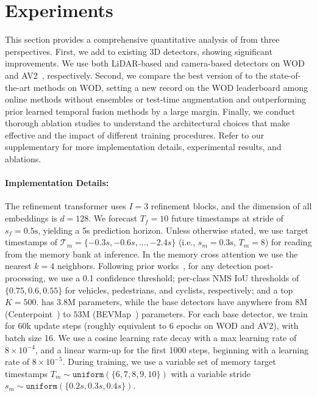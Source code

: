 

\section{Experiments}
\label{sec:experiments}

This section provides a comprehensive quantitative analysis of \ourmodel{}
from three perspectives. 
First, we add \ourmodel{} to existing 3D detectors, showing significant improvements. We use both LiDAR-based and camera-based detectors on WOD~\cite{WOD} and AV2~\cite{wilson2023argoverse}, respectively.
Second, we compare the best version of \ourmodel{} to the state-of-the-art methods on WOD, setting a new record on the WOD leaderboard among online methods without ensembles or test-time augmentation and outperforming prior learned temporal fusion methods by a large margin.
Finally, we conduct thorough ablation studies to understand the architectural choices that make \ourmodel{} effective and the impact of different training procedures.
Refer to our supplementary for more implementation details,
experimental results, and ablations.

\paragraph{Implementation Details:}

The refinement transformer uses $I = 3$ refinement blocks, and the dimension of all embeddings is $d = 128$.
We forecast $T_f = 10$ future timestamps at stride of $s_f = 0.5\text{s}$, yielding a 5s prediction horizon.
Unless otherwise stated, we use target timestamps of $\mathcal{T}_m = \{-0.3s, -0.6s, \dots, -2.4s\}$ (i.e., $s_m = 0.3\text{s}$, $T_m = 8$) for reading from the memory bank at inference.
In the memory cross attention we use the nearest $k=4$ neighbors.
Following prior works~\cite{hednet,safdnet,centerpoint}, for any detection post-processing, we use a 0.1 confidence threshold; per-class NMS IoU thresholds of $\{0.75, 0.6, 0.55\}$ for vehicles, pedestrians, and cyclists, respectively; and a top $K=500$.
\ourmodel{} has $3.8$M parameters, while the base detectors have anywhere from $8$M (Centerpoint~\cite{centerpoint}) to $53$M (BEVMap~\cite{chang2024bevmap}) parameters.
For each base detector, we train \ourmodel{} for 60k update steps (roughly equivalent to 6 epochs on WOD and AV2), with batch size 16.
We use a cosine learning rate decay with a max learning rate of $8 \times 10^{-4}$,
and a linear warm-up for the first 1000 steps, beginning with a learning
rate of $8 \times 10^{-5}$.
During training,
we use a variable set of memory target timestamps
$T_m \sim \texttt{uniform}(\{6, 7, 8, 9, 10\})$
with a variable stride $s_m \sim \texttt{uniform}(\{0.2s, 0.3s, 0.4s\})$.

